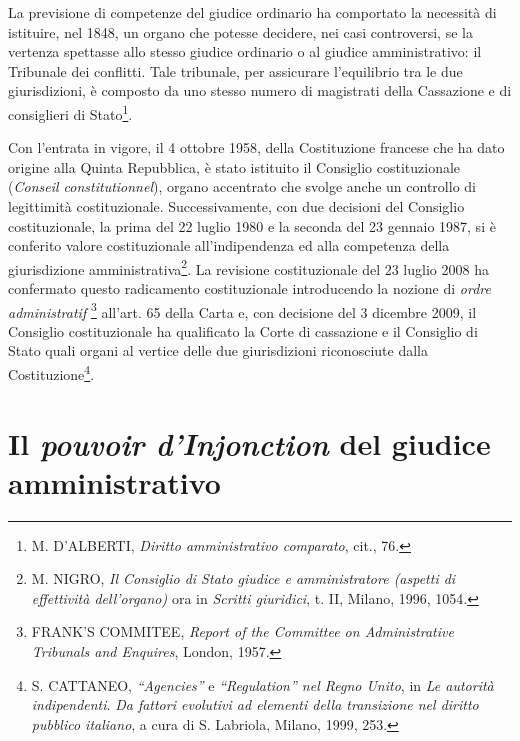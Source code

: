 \documentclass[12pt,it,a4paper,]{report}
\begin{document}
La previsione di competenze del giudice ordinario ha comportato la
necessità di istituire, nel 1848, un organo che potesse decidere, nei
casi controversi, se la vertenza spettasse allo stesso giudice ordinario
o al giudice amministrativo: il Tribunale dei conflitti. Tale tribunale,
per assicurare l'equilibrio tra le due giurisdizioni, è composto da uno
stesso numero di magistrati della Cassazione e di consiglieri di
Stato\footnote{M. D'ALBERTI, \emph{Diritto amministrativo comparato},
  cit., 76.}.

Con l'entrata in vigore, il 4 ottobre 1958, della Costituzione francese
che ha dato origine alla Quinta Repubblica, è stato istituito il
Consiglio costituzionale (\emph{Conseil constitutionnel}), organo
accentrato che svolge anche un controllo di legittimità costituzionale.
Successivamente, con due decisioni del Consiglio costituzionale, la
prima del 22 luglio 1980 e la seconda del 23 gennaio 1987, si è
conferito valore costituzionale all'indipendenza ed alla competenza
della giurisdizione amministrativa\footnote{M. NIGRO, \emph{Il Consiglio
  di Stato giudice e amministratore (aspetti di effettività
  dell'organo)} ora in \emph{Scritti giuridici}, t. II, Milano, 1996,
  1054.}. La revisione costituzionale del 23 luglio 2008 ha confermato
questo radicamento costituzionale introducendo la nozione di \emph{ordre
administratif} \footnote{FRANK'S COMMITEE, \emph{Report of the Committee
  on Administrative Tribunals and Enquires}, London, 1957.} all'art. 65
della Carta e, con decisione del 3 dicembre 2009, il Consiglio
costituzionale ha qualificato la Corte di cassazione e il Consiglio di
Stato quali organi al vertice delle due giurisdizioni riconosciute dalla
Costituzione\footnote{S. CATTANEO, \emph{``Agencies''} e
  \emph{``Regulation'' nel Regno Unito}, in \emph{Le autorità
  indipendenti}. \emph{Da fattori evolutivi ad elementi della
  transizione nel diritto pubblico italiano}, a cura di S. Labriola,
  Milano, 1999, 253.}.

\hypertarget{il-pouvoir-dinjonction-del-giudice-amministrativo}{%
\section{\texorpdfstring{Il \emph{pouvoir d'Injonction} del giudice
amministrativo}{Il pouvoir d'Injonction del giudice amministrativo}}\label{il-pouvoir-dinjonction-del-giudice-amministrativo}}
\end{document}
